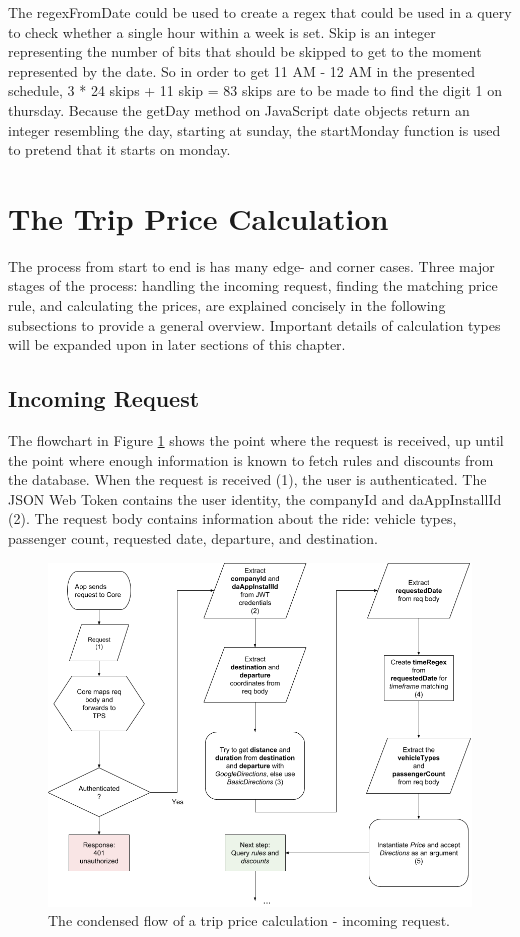 The regexFromDate could be used to create a regex that could be used in a query to check whether a single hour within a week is set. Skip is an integer representing the number of bits that should be skipped to get to the moment represented by the date. So in order to get 11 AM - 12 AM in the presented schedule, 3 * 24 skips + 11 skip = 83 skips are to be made to find the digit 1 on thursday. Because the getDay method on JavaScript date objects return an integer resembling the day, starting at sunday, the startMonday function is used to pretend that it starts on monday.

\section{The Trip Price Calculation}
The process from start to end is has many edge- and corner cases. Three major stages of the process: handling the incoming request, finding the matching price rule, and calculating the prices, are explained concisely in the following subsections to provide a general overview. Important details of calculation types will be expanded upon in later sections of this chapter.

\subsection{Incoming Request}
The flowchart in Figure \ref{fig:Incoming Request} shows the point where the request is received, up until the point where enough information is known to fetch rules and discounts from the database. When the request is received (1), the user is authenticated. The JSON Web Token contains the user identity, the companyId and daAppInstallId (2). The request body contains information about the ride: vehicle types, passenger count, requested date, departure, and destination.

\begin{figure}[H]
	\centering
	\includegraphics[width=.8\textwidth]{IncomingRequest}
	\caption[Incoming Request]{The condensed flow of a trip price calculation - incoming request.}
	\label{fig:Incoming Request}
\end{figure}

